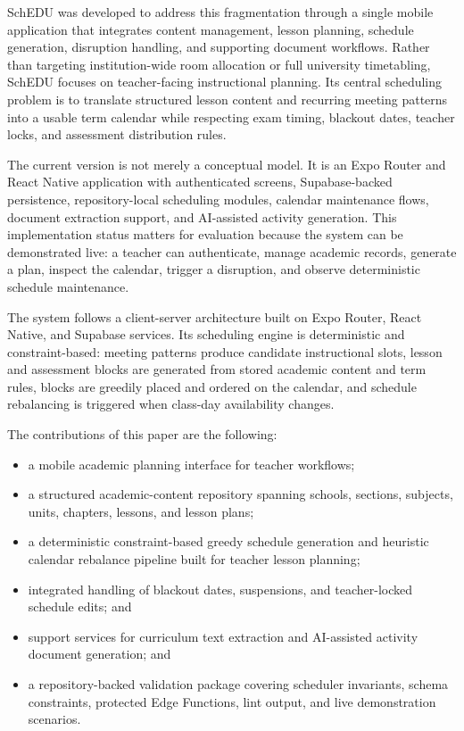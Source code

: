 \documentclass[conference]{IEEEtran}
\begin{document}
SchEDU was developed to address this fragmentation through a single mobile
application that integrates content management, lesson planning, schedule
generation, disruption handling, and supporting document workflows. Rather than
targeting institution-wide room allocation or full university timetabling, SchEDU
focuses on teacher-facing instructional planning. Its central scheduling problem is
to translate structured lesson content and recurring meeting patterns into a usable
term calendar while respecting exam timing, blackout dates, teacher locks, and
assessment distribution rules.

The current version is not merely a conceptual model. It is an Expo Router and
React Native application with authenticated screens, Supabase-backed persistence,
repository-local scheduling modules, calendar maintenance flows, document
extraction support, and AI-assisted activity generation. This implementation
status matters for evaluation because the system can be demonstrated live: a
teacher can authenticate, manage academic records, generate a plan, inspect the
calendar, trigger a disruption, and observe deterministic schedule maintenance.

The system follows a client-server architecture built on Expo Router, React Native,
and Supabase services. Its scheduling engine is deterministic and
constraint-based: meeting patterns produce candidate instructional slots, lesson
and assessment blocks are generated from stored academic content and term rules,
blocks are greedily placed and ordered on the calendar, and schedule rebalancing
is triggered when class-day availability changes.

The contributions of this paper are the following:
\begin{itemize}
\item a mobile academic planning interface for teacher workflows;
\item a structured academic-content repository spanning schools, sections, subjects,
units, chapters, lessons, and lesson plans;
\item a deterministic constraint-based greedy schedule generation and heuristic
calendar rebalance pipeline built for teacher lesson planning;
\item integrated handling of blackout dates, suspensions, and teacher-locked
schedule edits; and
\item support services for curriculum text extraction and AI-assisted activity
document generation; and
\item a repository-backed validation package covering scheduler invariants,
schema constraints, protected Edge Functions, lint output, and live demonstration
scenarios.
\end{itemize}
\end{document}
